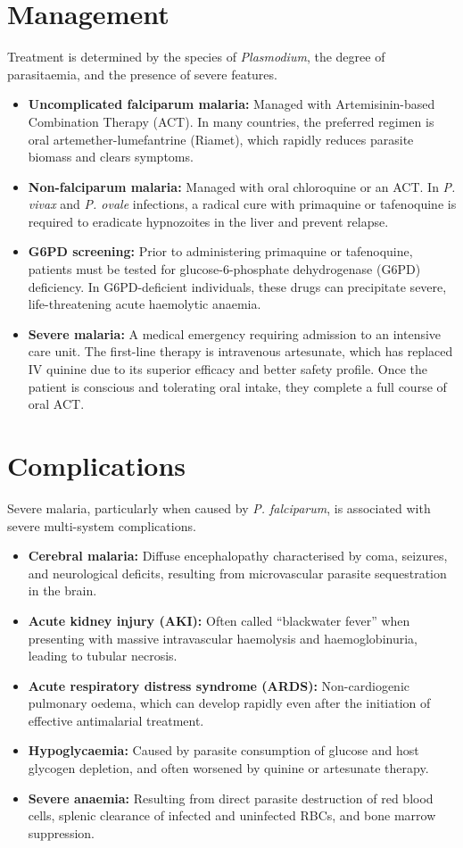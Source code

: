 \section*{Management}
Treatment is determined by the species of \textit{Plasmodium}, the degree of parasitaemia, and the presence of severe features.
\begin{itemize}
    \item \textbf{Uncomplicated falciparum malaria:} Managed with Artemisinin-based Combination Therapy (ACT). In many countries, the preferred regimen is oral artemether-lumefantrine (Riamet), which rapidly reduces parasite biomass and clears symptoms.
    \item \textbf{Non-falciparum malaria:} Managed with oral chloroquine or an ACT. In \textit{P. vivax} and \textit{P. ovale} infections, a radical cure with primaquine or tafenoquine is required to eradicate hypnozoites in the liver and prevent relapse.
    \item \textbf{G6PD screening:} Prior to administering primaquine or tafenoquine, patients must be tested for glucose-6-phosphate dehydrogenase (G6PD) deficiency. In G6PD-deficient individuals, these drugs can precipitate severe, life-threatening acute haemolytic anaemia.
    \item \textbf{Severe malaria:} A medical emergency requiring admission to an intensive care unit. The first-line therapy is intravenous artesunate, which has replaced IV quinine due to its superior efficacy and better safety profile. Once the patient is conscious and tolerating oral intake, they complete a full course of oral ACT.
\end{itemize}

\section*{Complications}
Severe malaria, particularly when caused by \textit{P. falciparum}, is associated with severe multi-system complications.
\begin{itemize}
    \item \textbf{Cerebral malaria:} Diffuse encephalopathy characterised by coma, seizures, and neurological deficits, resulting from microvascular parasite sequestration in the brain.
    \item \textbf{Acute kidney injury (AKI):} Often called ``blackwater fever'' when presenting with massive intravascular haemolysis and haemoglobinuria, leading to tubular necrosis.
    \item \textbf{Acute respiratory distress syndrome (ARDS):} Non-cardiogenic pulmonary oedema, which can develop rapidly even after the initiation of effective antimalarial treatment.
    \item \textbf{Hypoglycaemia:} Caused by parasite consumption of glucose and host glycogen depletion, and often worsened by quinine or artesunate therapy.
    \item \textbf{Severe anaemia:} Resulting from direct parasite destruction of red blood cells, splenic clearance of infected and uninfected RBCs, and bone marrow suppression.
\end{itemize}

